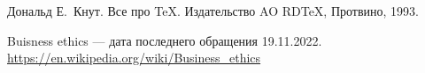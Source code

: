 \newpage
\begin{thebibliography}{0}

 Дональд Е.~Кнут.
Все про \TeX. Издательство AO RDTeX,
Протвино, 1993.

 Buisness ethics
--- дата последнего обращения 19.11.2022.
\url{https://en.wikipedia.org/wiki/Business_ethics}

\end{thebibliography}
